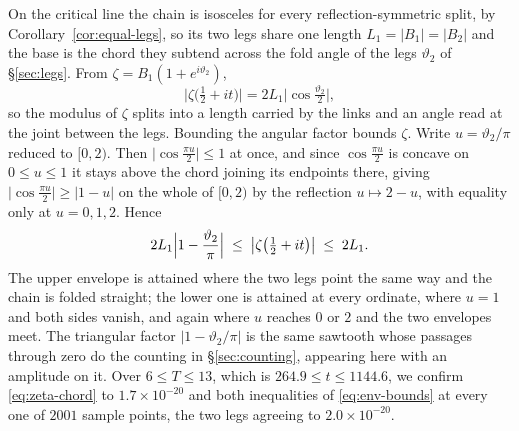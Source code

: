 \documentclass[11pt]{article}
\theoremstyle{definition}
\begin{document}
On the critical line the chain is isosceles for every reflection-symmetric
split, by Corollary~\ref{cor:equal-legs}, so its two legs share one length
$L_1=|B_1|=|B_2|$ and the base is the chord they subtend across the fold
angle of the legs $\vartheta_2$ of \S\ref{sec:legs}. From $\zeta=B_1(1+e^{i\vartheta_2})$,
\begin{equation}\label{eq:zeta-chord}
\bigl|\zeta\bigl(\tfrac12+it\bigr)\bigr|
=2L_1\bigl|\cos\tfrac{\vartheta_2}{2}\bigr| ,
\end{equation}
so the modulus of $\zeta$ splits into a length carried by the links and an angle
read at the joint between the legs. Bounding the angular factor bounds $\zeta$.
Write $u=\vartheta_2/\pi$ reduced to $[0,2)$. Then
$\bigl|\cos\tfrac{\pi u}{2}\bigr|\leq1$ at once, and since
$\cos\tfrac{\pi u}{2}$ is concave on $0\leq u\leq1$ it stays above the chord
joining its endpoints there, giving
$\bigl|\cos\tfrac{\pi u}{2}\bigr|\geq|1-u|$ on the whole of $[0,2)$ by the
reflection $u\mapsto2-u$, with equality only at $u=0,1,2$. Hence
\begin{equation}\label{eq:env-bounds}
2L_1\Bigl|1-\frac{\vartheta_2}{\pi}\Bigr|
\;\leq\;\bigl|\zeta\bigl(\tfrac12+it\bigr)\bigr|\;\leq\;2L_1 .
\end{equation}
The upper envelope is attained where the two legs point the same way and the
chain is folded straight; the lower one is attained at every ordinate, where
$u=1$ and both sides vanish, and again where $u$ reaches $0$ or $2$ and the two
envelopes meet. The triangular factor $|1-\vartheta_2/\pi|$ is the same sawtooth
whose passages through zero do the counting in \S\ref{sec:counting}, appearing
here with an amplitude on it. Over $6\leq T\leq13$, which is
$264.9\leq t\leq1144.6$, we confirm \eqref{eq:zeta-chord} to
$1.7\times10^{-20}$ and both inequalities of \eqref{eq:env-bounds} at every one
of $2001$ sample points, the two legs agreeing to $2.0\times10^{-20}$.
\end{document}
